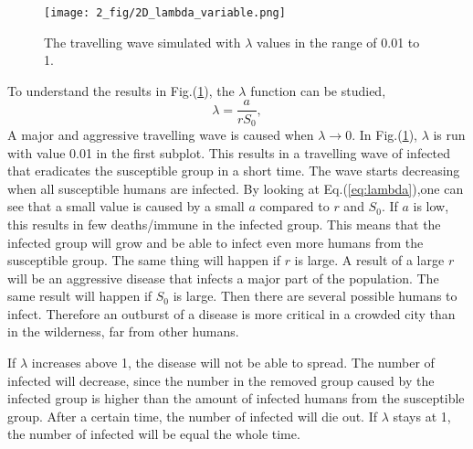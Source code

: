 \documentclass[%
twoside,                 %
final,                   %
chapterprefix=true,      %
open=right               %
10pt]{book}
\begin{document}
\begin{figure}[ht]
  \centerline{\texttt{[image: 2\_fig/2D\_lambda\_variable.png]}}
  \caption{
  \label{fig:change_lambda} The travelling wave simulated with $\lambda$ values in the range of 0.01 to 1.
  }
\end{figure}




\vspace{3mm}




\vspace{3mm}


To understand the results in Fig.(\ref{fig:change_lambda}), the $\lambda $ function can be studied,
\begin{equation} \label{eq:lambda}
 \lambda =\frac{a}{rS_0},
\end{equation}
A major and aggressive travelling wave is caused when $\lambda \rightarrow 0$. In Fig.(\ref{fig:change_lambda}), $\lambda$ is run with value 0.01 in the first subplot. This results in a travelling wave of infected that eradicates the susceptible group in a short time. The wave starts decreasing when all susceptible humans are infected. By looking at Eq.(\ref{eq:lambda}),one can see that a small value is caused by a small $a$ compared to $r$ and $S_0$. If $a$ is low, this results in few deaths/immune in the infected group. This means that the infected group will grow and be able to infect even more humans from the susceptible group. The same thing will happen if $r$ is large. A result of a large $r$ will be an aggressive disease that infects  a major part of the population. The same result will happen if $S_0$ is large. Then there are several possible humans to infect. Therefore an outburst of a disease is more critical in a crowded city than in the wilderness, far from other humans.


\vspace{3mm}




\vspace{3mm}


If $\lambda$ increases above 1, the disease will not be able to spread. The number of infected will decrease, since the number in the removed group caused by the infected group is higher than the amount of infected humans from the susceptible group. After a certain time, the number of infected will die out. If $\lambda$ stays at 1, the number of infected will be equal the whole time. 
\end{document}
